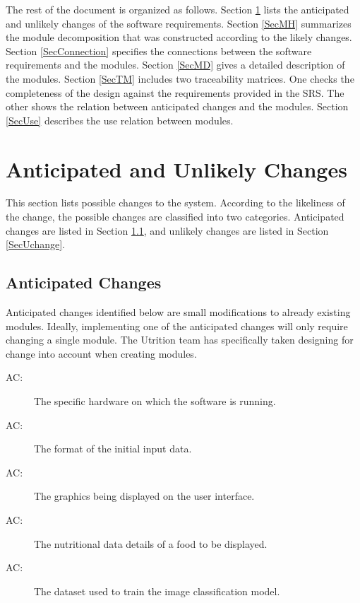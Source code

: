 \documentclass[12pt, titlepage]{article}
\newcounter{acnum}
\newcommand{\actheacnum}{AC\theacnum}
\begin{document}
The rest of the document is organized as follows. Section
\ref{SecChange} lists the anticipated and unlikely changes of the software
requirements. Section \ref{SecMH} summarizes the module decomposition that
was constructed according to the likely changes. Section \ref{SecConnection}
specifies the connections between the software requirements and the
modules. Section \ref{SecMD} gives a detailed description of the
modules. Section \ref{SecTM} includes two traceability matrices. One checks
the completeness of the design against the requirements provided in the SRS. The
other shows the relation between anticipated changes and the modules. Section
\ref{SecUse} describes the use relation between modules.

\section{Anticipated and Unlikely Changes} \label{SecChange}

This section lists possible changes to the system. According to the likeliness
of the change, the possible changes are classified into two
categories. Anticipated changes are listed in Section \ref{SecAchange}, and
unlikely changes are listed in Section \ref{SecUchange}.

\subsection{Anticipated Changes} \label{SecAchange}

Anticipated changes identified below are small modifications to already existing modules. Ideally, implementing one of the anticipated changes will only
require changing a single module. The Utrition team has specifically taken designing for
change into account when creating modules.

\begin{description}
\item[ \actheacnum \label{acHardware}:] The specific
  hardware on which the software is running.
\item[ \actheacnum \label{acInput}:] The format of the
  initial input data.
\item [ \actheacnum \label{acInput}:] The graphics being displayed on the user interface.
\item [ \actheacnum \label{acInput}:]  The nutritional data details of a food to be displayed. 
\item [ \actheacnum \label{acInput}:] The dataset used to train the image classification model.
\end{description}
\end{document}
